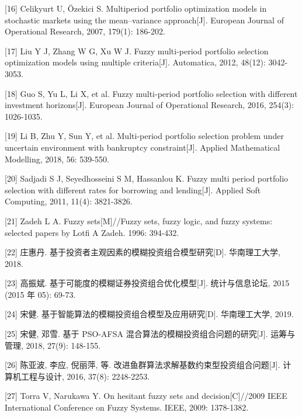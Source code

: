 \documentclass[]{article}
\begin{document}
{[}16{]} Celikyurt U, Özekici S. Multiperiod portfolio optimization
models in stochastic markets using the mean--variance approach{[}J{]}.
European Journal of Operational Research, 2007, 179(1): 186-202.

{[}17{]} Liu Y J, Zhang W G, Xu W J. Fuzzy multi-period portfolio
selection optimization models using multiple criteria{[}J{]}.
Automatica, 2012, 48(12): 3042-3053.

{[}18{]} Guo S, Yu L, Li X, et al. Fuzzy multi-period portfolio
selection with different investment horizons{[}J{]}. European Journal of
Operational Research, 2016, 254(3): 1026-1035.

{[}19{]} Li B, Zhu Y, Sun Y, et al. Multi-period portfolio selection
problem under uncertain environment with bankruptcy constraint{[}J{]}.
Applied Mathematical Modelling, 2018, 56: 539-550.

{[}20{]} Sadjadi S J, Seyedhosseini S M, Hassanlou K. Fuzzy multi period
portfolio selection with different rates for borrowing and
lending{[}J{]}. Applied Soft Computing, 2011, 11(4): 3821-3826.

{[}21{]} Zadeh L A. Fuzzy sets{[}M{]}//Fuzzy sets, fuzzy logic, and
fuzzy systems: selected papers by Lotfi A Zadeh. 1996: 394-432.

{[}22{]} 庄惠丹. 基于投资者主观因素的模糊投资组合模型研究{[}D{]}.
华南理工大学, 2018.

{[}23{]} 高振斌. 基于可能度的模糊证券投资组合优化模型{[}J{]}.
统计与信息论坛, 2015 (2015 年 05): 69-73.

{[}24{]} 宋健. 基于智能算法的模糊投资组合模型及应用研究{[}D{]}.
华南理工大学, 2019.

{[}25{]} 宋健, 邓雪. 基于 PSO-AFSA
混合算法的模糊投资组合问题的研究{[}J{]}. 运筹与管理, 2018, 27(9):
148-155.

{[}26{]} 陈亚波, 李应, 倪丽萍, 等.
改进鱼群算法求解基数约束型投资组合问题{[}J{]}. 计算机工程与设计, 2016,
37(8): 2248-2253.

{[}27{]} Torra V, Narukawa Y. On hesitant fuzzy sets and
decision{[}C{]}//2009 IEEE International Conference on Fuzzy Systems.
IEEE, 2009: 1378-1382.
\end{document}
